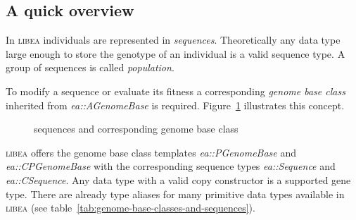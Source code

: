 \documentclass[a4paper]{article}
\begin{document}
\subsection{A quick overview}

In \textsc{libea} individuals are represented in \textit{sequences}. Theoretically any data type large enough to store the genotype of an individual is a valid sequence type. A group of sequences is called \textit{population}.

To modify a sequence or evaluate its fitness a corresponding \textit{genome base class} inherited from \textit{ea::AGenomeBase} is required. Figure~\ref{fig:overview} illustrates this concept.

\begin{figure}[h]
\caption{sequences and corresponding genome base class}
\label{fig:overview}
{

}
\end{figure}

\textsc{libea} offers the genome base class templates \textit{ea::PGenomeBase} and \textit{ea::CPGenomeBase} with the corresponding sequence types \textit{ea::Sequence} and \textit{ea::CSequence}. Any data type with a valid copy constructor is a supported gene type. There are already type aliases for many primitive data types available in \textsc{libea} (see table~\ref{tab:genome-base-classes-and-sequences}).
\end{document}
